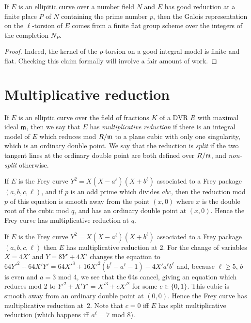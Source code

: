 \begin{theorem}\label{good_reduction_implies_flat} If $E$ is an ellipitic curve over a number field 
  $N$ and $E$ has good reduction at a finite place $P$ of $N$ containing the prime number $p$, 
  then the Galois representation on the $\ell$-torsion of $E$ comes from a finite flat group scheme 
  over the integers of the completion $N_P$.
\end{theorem}
\begin{proof}
  Indeed, the kernel of the $p$-torsion on a good integral model is finite and flat.
  Checking this claim formally will involve a fair amount of work.
\end{proof}

\section{Multiplicative reduction}

If $E$ is an elliptic curve over the field of fractions $K$ of a DVR $R$ with maximal ideal $\mathfrak{m}$,
then we say that $E$ has \emph{multiplicative reduction} if there is an integral model of $E$
which reduces mod $R/\mathfrak{m}$ to a plane cubic with only one singularity, which is an ordinary double point.
We say that the reduction is \emph{split} if the two tangent lines at the ordinary double point
are both defined over $R/\mathfrak{m}$, and \emph{non-split} otherwise.

\begin{example} If $E$ is the Frey curve $Y^2=X(X-a^\ell)(X+b^\ell)$ associated to a Frey
  package $(a,b,c,\ell)$, and if $p$ is an odd prime
  which divides $abc$, then the reduction mod $p$ of this equation is smooth
  away from the point $(x,0)$ where $x$ is the double root of the cubic mod $q$,
  and has an ordinary double point at $(x,0)$. Hence the Frey curve has
  multiplicative reduction at $q$.
\end{example}

\begin{example} If $E$ is the Frey curve $Y^2=X(X-a^\ell)(X+b^\ell)$ associated to a Frey package
  $(a,b,c,\ell)$ then $E$ has multiplicative reduction at 2. For the change of variables $X=4X'$ 
  and $Y=8Y'+4X'$ changes the equation to 
  $64Y'^2+64X'Y'=64X'^3+16X'^2(b^\ell-a^\ell-1)-4X'a^\ell b^\ell$ and, because $\ell\geq5$,
  $b$ is even and $a=3$ mod 4, we see that the 64s cancel, giving an equation which reduces mod 2 to
  $Y'^2+X'Y'=X'^3+cX'^2$ for some $c\in\{0,1\}$. This cubic is smooth away from an ordinary 
  double point at $(0,0)$. Hence the Frey curve has multiplicative reduction at~2. Note
  that $c=0$ iff $E$ has split multiplicative reduction (which happens iff $a^\ell=7$ mod $8$).
\end{example}

